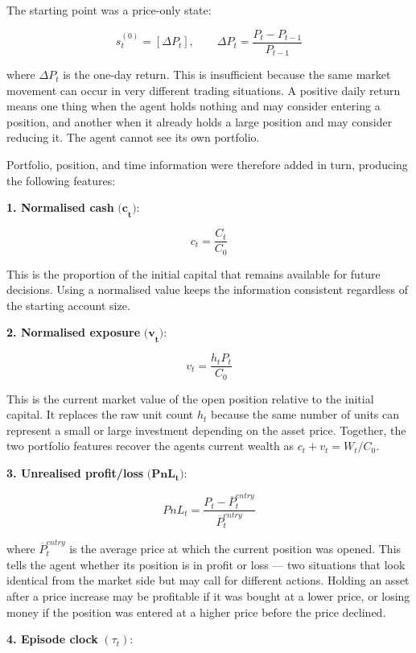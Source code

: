 The starting point was a price-only state:

\[s_{t}^{(0)} = \left\lbrack \Delta P_{t} \right\rbrack,\qquad\Delta P_{t} = \frac{P_{t} - P_{t - 1}}{P_{t - 1}}\]

where \(\Delta P_{t}\) is the one-day return.
This is insufficient because the same market movement can occur in very
different trading situations. A positive daily return means one thing
when the agent holds nothing and may consider entering a position, and
another when it already holds a large position and may consider reducing
it. The agent cannot see its own portfolio.

Portfolio, position, and time information were therefore added in turn,
producing the following features:

\textbf{1. Normalised cash} \(\mathbf{(c}_{\mathbf{t}}\mathbf{)}\):

\[c_{t} = \frac{C_{t}}{C_{0}}\]

This is the proportion of the initial capital that remains available for
future decisions. Using a normalised value keeps the information
consistent regardless of the starting account size.

\textbf{2. Normalised exposure} \(\mathbf{(v}_{\mathbf{t}}\mathbf{)}\):

\[v_{t} = \frac{h_{t}P_{t}}{C_{0}}\]

This is the current market value of the open position relative to the
initial capital. It replaces the raw unit count \(h_{t}\) because the
same number of units can represent a small or large investment depending
on the asset price. Together, the two portfolio features recover the
agent\textquotesingle s current wealth as \(c_{t} + v_{t} = W_{t}/C_{0}\).

\textbf{3. Unrealised profit/loss}
\(\mathbf{(Pn}\mathbf{L}_{\mathbf{t}}\mathbf{)}\):

\[PnL_{t} = \frac{P_{t} - {\overline{P}}_{t}^{entry}}{{\overline{P}}_{t}^{entry}}\]

where \({\overline{P}}_{t}^{entry}\) is the average price at which the
current position was opened. This tells the agent whether its position
is in profit or loss --- two situations that look identical from the
market side but may call for different actions. Holding an asset after
a price increase may be profitable if it was bought at a lower price,
or losing money if the position was entered at a higher price before
the price declined.

\textbf{4. Episode clock} \((\tau_{t})\):

